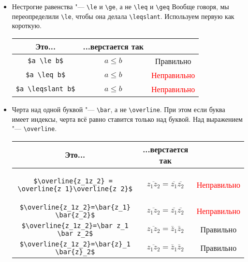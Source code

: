 \documentclass[12pt,a4paper]{book}
\renewcommand{\le}{\leqslant}
\renewcommand{\ge}{\geqslant}
\newcommand{\ok}{& \textcolor{green!60!black}{Правильно}}
\newcommand{\bad}{& \textcolor{red}{Неправильно}}
\begin{document}
\begin{enumerate}
\begin{itemize}
	\item
		Нестрогие равенства "--- \verb'\le' и \verb'\ge', а не \verb'\leq' и \verb'\geq' 
		Вообще говоря, мы переопределили \verb'\le', чтобы она делала \verb'\leqslant'.
		Используем первую как короткую.
		\begin{center}\begin{tabular}{|c|c|c|}
			\hline Это... & ...верстается так & \\
			\hline \verb'$a \le b$' & $a \le b$ \ok \\
			\hline \verb'$a \leq b$' & $a \leq b$ \bad \\
			\hline \verb'$a \leqslant b$' & $a \leqslant b$ \bad \\
			\hline
		\end{tabular}\end{center}
	
	\item 
		Черта над одной буквой "--- \verb'\bar', а не \verb'\overline'.
		При этом если буква имеет индексы, черта всё равно ставится только над буквой.
		Над выражением "--- \verb'\overline'.
		\begin{center}\begin{tabular}{|c|c|c|}
			\hline Это... & ...верстается так & \\
			\hline
			\begin{minipage}{10cm}
				\begin{verbatim}
$\overline{z_1z_2} = 
\overline{z_1}\overline{z_2}$
\end{verbatim}
			\end{minipage}
			& $\overline{z_1z_2} = \overline{z_1}\overline{z_2}$ \bad \\
			\hline \verb'$\overline{z_1z_2}=\bar{z_1} \bar{z_2}$' & $\overline{z_1z_2} = \bar{z_1} \bar{z_2}$ \bad \\
			\hline \verb'$\overline{z_1z_2}=\bar z_1 \bar z_2$' & $\overline{z_1z_2} = \bar z_1 \bar z_2$ \ok \\
			\hline \verb'$\overline{z_1z_2}=\bar{z}_1 \bar{z}_2$' & $\overline{z_1z_2} = \bar z_1 \bar z_2$ \ok \\
			\hline
		\end{tabular}\end{center}


\end{itemize}
\end{enumerate}
\end{document}
